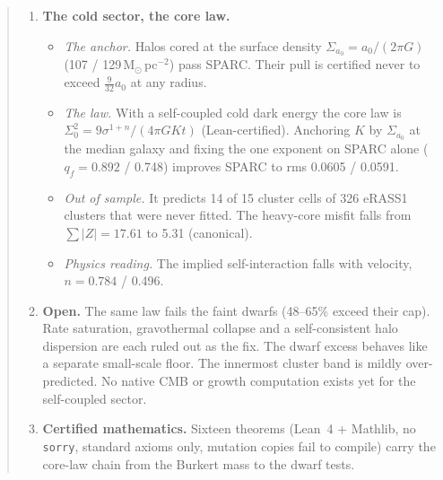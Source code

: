 \documentclass[10pt]{article}
\begin{document}
\begin{abstract}
\begin{enumerate}
\item \textbf{The cold sector, the core law.}
\begin{itemize}
\item \emph{The anchor.} Halos cored at the surface density $\Sigma_{a_0}=a_0/(2\pi G)$ (107 / 129\,M$_\odot$\,pc$^{-2}$) pass SPARC. Their pull is certified never to exceed $\tfrac{9}{32}a_0$ at any radius.
\item \emph{The law.} With a self-coupled cold dark energy the core law is $\Sigma_0^2=9\sigma^{1+n}/(4\pi GKt)$ (Lean-certified). Anchoring $K$ by $\Sigma_{a_0}$ at the median galaxy and fixing the one exponent on SPARC alone ($q_f=0.892$ / 0.748) improves SPARC to rms 0.0605 / 0.0591.
\item \emph{Out of sample.} It predicts 14 of 15 cluster cells of 326 eRASS1 clusters that were never fitted. The heavy-core misfit falls from $\sum|Z|=17.61$ to 5.31 (canonical).
\item \emph{Physics reading.} The implied self-interaction falls with velocity, $n=0.784$ / 0.496.
\end{itemize}
\item \textbf{Open.} The same law fails the faint dwarfs (48--65\% exceed their cap). Rate saturation, gravothermal collapse and a self-consistent halo dispersion are each ruled out as the fix. The dwarf excess behaves like a separate small-scale floor. The innermost cluster band is mildly over-predicted. No native CMB or growth computation exists yet for the self-coupled sector.
\item \textbf{Certified mathematics.} Sixteen theorems (Lean~4 + Mathlib, no \texttt{sorry}, standard axioms only, mutation copies fail to compile) carry the core-law chain from the Burkert mass to the dwarf tests.
\end{enumerate}
\end{abstract}
\end{document}
